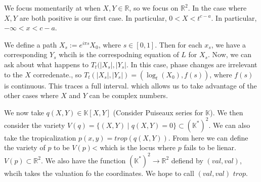 \documentclass[12pt]{memoir}
\theoremstyle{definition}
\def\RR{{\mathbb R}}
\def\KK{{\mathbb K}}
\begin{document}
We focus momentarily at when $X,Y \in \RR$, so we focus on $\RR^2$. In the case where $X,Y$ are both positive is our first case. In particular, $0<X<t^{c-a}$. In particular, $-\infty<x<c-a$.


We define a path $X_s :=e^{i\pi s}X_0$, where $s \in [0,1]$. Then for each $x_s$, we have a corresponding $Y_s$ whcih is the correspodning equation of $L$ for $X_s$. Now, we can ask about what happens to $T_t(|X_s|, |Y_s|$. In this case, phase changes are irrelevant to the $X$ corredenate., so $T_t(|X_s|,|Y_s|)= (\log_t(X_0), f(s))$, where $f(s)$ is continuous. This traces a full interval. which allows us to take advantage of the other cases where $X$ and $Y$ can be complex numbers.





We now take $q(X,Y)\in \KK[X,Y]$ (Consider Puiseaux series for $\KK$). We then consider the variety $V(q) = \{(X,Y) \; |\; q(X,Y) = 0 \} \subset (\KK^*)^2$. We can also take the tropicalization $p(x,y) = trop(q(X,Y))$. From here we can define the variety of $p$ to be $V(p)$< which is the locus where $p$ fails to be lienar. $V(p) \subset \RR^2$. We also have the function $(\KK^*)^2 \rightarrow \RR^2$ defiend by $(val, val)$, whcih takes the valuation fo the coordinates. We hope to call $(val, val)$ $trop$. 
\end{document}
